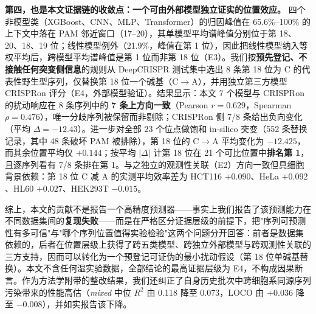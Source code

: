 \textbf{第四，也是本文证据链的收敛点：一个可由外部模型独立证实的位置效应。} 四个非模型类（XGBoost、CNN、MLP、Transformer）的归因峰值在 65.6\%--100\% 的上下文中落在 PAM 邻近窗口（17--20），其单模型平均谱峰值分别位于第 18、20、18、19 位；线性模型例外（21.9\%，峰值在第 1 位），因此把线性模型纳入等权平均后，跨模型平均谱峰值是第 1 位而非第 18 位（E3）。我们按\textbf{预先登记、不接触任何突变侧信息}的规则从 DeepCRISPR 测试集中选出 8 条第 18 位为 C 的代表性野生型序列，仅替换第 18 位一个碱基（C$\rightarrow$A），并用独立第三方模型 CRISPRon 评分（E4，外部模型验证）。结果显示：本文 7 个模型与 CRISPRon 的扰动响应在 8 条序列中的 \textbf{7 条上方向一致}（Pearson $r=0.629$，Spearman $\rho=0.476$），唯一分歧序列被保留而非剔除；CRISPRon 侧 7/8 条给出负向变化（平均 $\Delta=-12.43$）。进一步对全部 23 个位点做饱和 in-silico 突变（552 条替换记录，其中 48 条破坏 PAM 被排除），第 18 位的 C$\rightarrow$A 平均变化为 $-12.425$，而其余位置平均仅 $+0.144$；按平均 $|\Delta|$ 计第 18 位在 21 个可比位置中\textbf{排名第 1}，且逐序列看有 7/8 条排在第 1。与之独立的观测性关联（E2）方向一致但具细胞背景依赖：第 18 位 C 减 A 的实测平均效率差为 HCT116 $+0.090$、HeLa $+0.092$、HL60 $+0.027$、HEK293T $-0.015$。

综上，本文的贡献不是报告一个高精度预测器——事实上我们报告了该预测能力在不同数据集间的\textbf{复现失败}——而是在严格区分证据层级的前提下，把"序列可预测性有多可信"与"哪个序列位置值得实验检验"这两个问题分开回答：前者是数据集依赖的，后者在位置层级上获得了跨五类模型、跨独立外部模型与跨观测性关联的三方支持，因而可以转化为一个预登记可证伪的最小扰动假设（第 18 位单碱基替换）。本文不含任何湿实验数据，全部结论的最高证据层级为 E4，不构成因果断言。作为方法学附带的整改结果，我们还纠正了自身历史批次中跨细胞系同源序列污染带来的性能高估（\emph{mixed} 中位 $R^{2}$ 由 0.118 降至 0.073，LOCO 由 $+0.036$ 降至 $-0.008$），并如实报告该下降。
